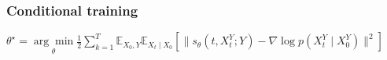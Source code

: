 



\subsubsection*{Conditional training}

$\theta^{\star}=\underset{\theta}{\arg \min } \frac{1}{2} \sum_{k=1}^{T} \mathbb{E}_{X_{0}, Y} \mathbb{E}_{X_{t} \mid X_{0}}[\|s_{\theta}(t, X_{t}^{Y} ; Y)-\nabla \log p(X_{t}^{Y} \mid X_{0}^{Y})\|^{2}]$






